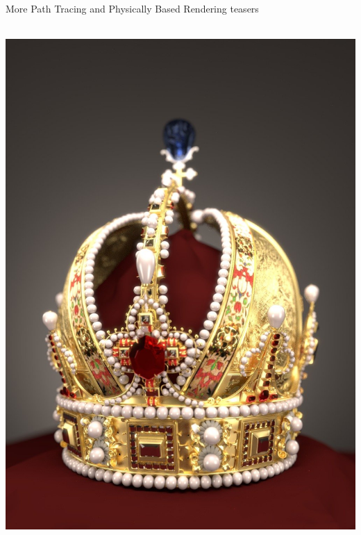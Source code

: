 \documentclass[utf8,stillsansserifmath,fleqn,t]{beamer}
\begin{document}
\begin{frame}
\frametitle{\insertsection}
More Path Tracing and Physically Based Rendering teasers\\~\\
\begin{minipage}{.32\textwidth}
\includegraphics[width=\textwidth]{./fig/pbrt-crown.jpg}
\end{minipage}\hspace{3em}
\begin{minipage}{.28\textwidth}

\end{minipage}
\end{frame}
\end{document}
